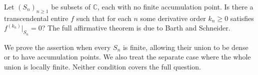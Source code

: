 Let $(S_n)_{n\ge1}$ be subsets of $\mathbb C$, each with no finite accumulation point. Is there a transcendental entire $f$ such that for each $n$ some derivative order $k_n\ge0$ satisfies $f^{(k_n)}|_{S_n}=0$? The full affirmative theorem is due to Barth and Schneider.

We prove the assertion when every $S_n$ is finite, allowing their union to be dense or to have accumulation points. We also treat the separate case where the whole union is locally finite. Neither condition covers the full question.
